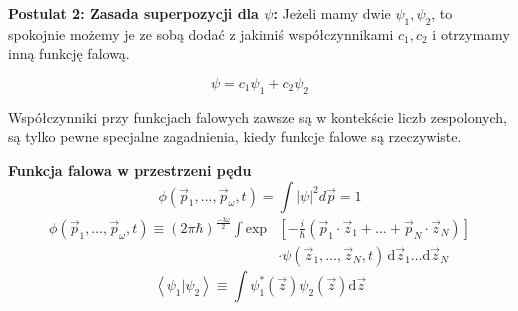 \textbf{Postulat 2: Zasada superpozycji dla $\psi$:} Jeżeli mamy dwie $\psi_1, \psi_2$, to spokojnie możemy je ze sobą dodać z jakimiś współczynnikami $c_1, c_2$ i otrzymamy inną funkcję falową. 

\begin{equation*}
	\psi = c_1 \psi_1 + c_2 \psi_2
\end{equation*}

Współczynniki przy funkcjach falowych zawsze są w kontekście liczb zespolonych, są tylko pewne specjalne zagadnienia, kiedy funkcje falowe są rzeczywiste.

\textbf{Funkcja falowa w przestrzeni pędu}
\begin{equation*}
	\phi (\vec{p}_1, \dots, \vec{p}_{\omega}, t) = \int |\psi|^2 d \vec{p} = 1
\end{equation*}
\begin{equation*}
	\begin{split}
		\phi (\vec{p}_1, \dots, \vec{p}_{\omega}, t) \equiv (2 \pi \hbar)^{\frac{-3\omega}{2}} \int \text{exp}&\left[ -\frac{i}{\hbar} (\vec{p}_1 \cdot \vec{z}_1 + \dots + \vec{p}_N \cdot \vec{z}_N)  \right] \\
		&\cdot \psi(\vec{z}_1, \dots, \vec{z}_N, t) \hspace{2pt} \text{d}\vec{z}_1 \dots \text{d}\vec{z}_N
	\end{split}
\end{equation*}
\begin{equation*}
	\left< \psi_1 \vert \psi_2 \right> \equiv \int \psi_1^*(\vec{z}) \psi_2(\vec{z})\text{d}\vec{z} 	
\end{equation*}
